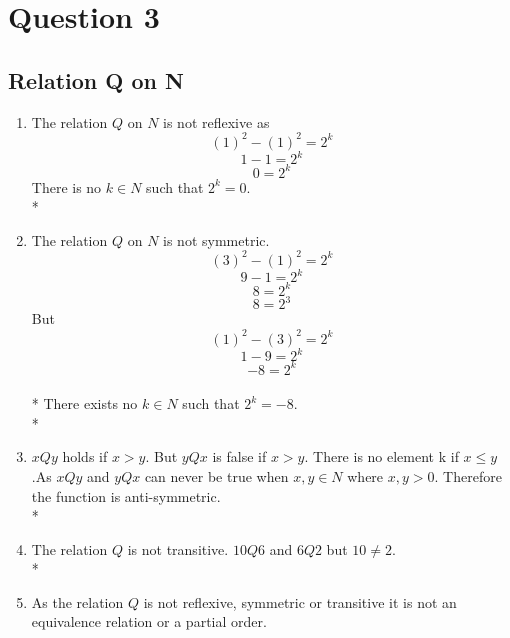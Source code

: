 \documentclass[a4paper,12pt]{article}
\begin{document}
\section{Question 3}
\subsection{Relation Q on N}
\begin{enumerate}
  \item    The relation $Q$ on $N$ is not reflexive as \[(1)^2 - (1)^2 = 2^k\]
\[1 - 1 = 2^k\]
\[0 = 2^k\]
There is no $k \in N$ such that $2^k = 0$.
\\*
\\
\item
  The relation $Q$ on $N$ is not symmetric. \[(3)^2 - (1)^2 = 2^k\]
\[9 -1 = 2^k\]
\[8 = 2^k\]
\[8 = 2^3\]
But \[(1)^2 - (3)^2 = 2^k\]
\[1 - 9 = 2^k\]
\[ -8 = 2^k \]
\\*
There exists no $k \in N$ such that $2^k = -8$.
\\*
\\
\item
  $xQy$ holds if $x > y$. But $yQx$ is false if $x > y$. There is no element k if $x \leq y$.As $xQy$ and $yQx$ can never be true when $x,y \in N$ where $x,y > 0$. Therefore the function is anti-symmetric.
\\* 
\\ 
\item
  The relation $Q$ is not transitive. $10Q6$ and $6Q2$ but $10 \not= 2$.
\\*
\\
\item
  As the relation $Q$ is not reflexive, symmetric or transitive it is not an equivalence 
relation or a partial order.
\end{enumerate}
\end{document}
